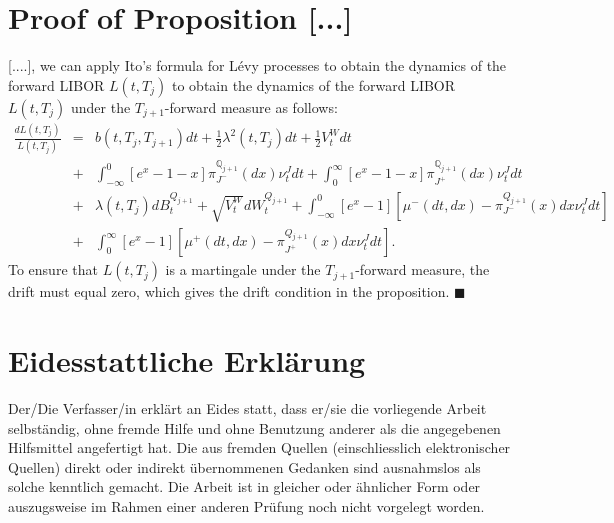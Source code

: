 \documentclass[11pt,a4paper,english,oneside]{book}
\numberwithin{equation}{chapter}
\begin{document}
\section{Proof of Proposition [...] }
[....], we can apply Ito's formula for Lévy processes   to obtain the
dynamics of the forward LIBOR $L(t,T_j)$ to obtain the
dynamics of the forward LIBOR $L(t,T_j)$ under the $T_{j+1}$-forward measure
as follows:
\begin{eqnarray}
\frac{dL(t,T_j)}{L(t,T_j)} &=& b (t,T_{j},T_{j+1}) dt +
\frac{1}{2} \lambda ^2(t,T_j) dt +
\frac{1}{2} V _t^W dt\nonumber \\
&+& \int_{-\infty}^{0}  \left[ e^{x}-1-x \right]
\pi_{J^-}^{\mathbb Q_{j+1}}(dx)\nu _t^J dt + \int_{0}^{\infty} \left[
e^{x}-1-x \right] \pi_{J^+}^{\mathbb Q_{j+1}}(dx)\nu _t^Jdt \nonumber \\
&+& \lambda (t,T_j) dB_{t}^{Q_{j+1}}+ \sqrt{ V _t^W}
dW_{t}^{Q_{j+1}}+ \int_{-\infty}^{0} \left[ e^{ x}-1 \right]
\left[ \mu^- (dt,dx) -
\pi_{J^-}^{Q_{j+1}}(x) dx \nu _t^J dt \right]\nonumber \\
&+& \int_{0}^{\infty} \left[ e^{ x}-1 \right] \left[ \mu ^+ (dt,dx)
- \pi_{J^+}^{Q_{j+1}}(x) dx \nu _t^J dt \right].
\end{eqnarray}
To ensure that $L(t,T_j)$ is a martingale under the
$T_{j+1}$-forward measure, the drift must equal zero, which gives the
drift condition in the proposition. $\blacksquare$





\newpage
\thispagestyle{firststyle}
\section*{Eidesstattliche Erklärung}
Der/Die Verfasser/in erklärt an Eides statt, dass er/sie die vorliegende Arbeit selbständig, ohne fremde Hilfe und ohne Benutzung anderer als die angegebenen Hilfsmittel angefertigt hat. Die aus fremden Quellen (einschliesslich elektronischer Quellen) direkt oder indirekt übernommenen Gedanken sind ausnahmslos als solche kenntlich gemacht. Die Arbeit ist in gleicher oder ähnlicher Form oder auszugsweise im Rahmen einer anderen Prüfung noch nicht vorgelegt worden.\\[2cm]
 \hfill {}
\end{document}
